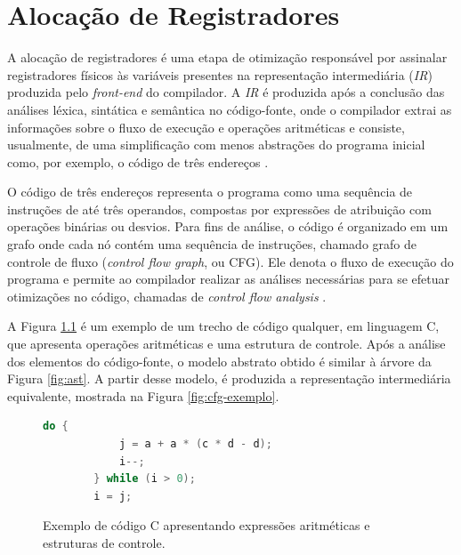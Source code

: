 \documentclass[
	12pt,				%
	openright,			%
	twoside,			%
	a4paper,			%
	tcc,			%
	]{ABNT-DC-UEL}
\begin{document}


% 

\chapter{Alocação de Registradores}

A alocação de registradores é uma etapa de otimização responsável por assinalar registradores físicos às variáveis presentes na representação intermediária (\textit{IR}) produzida pelo \textit{front-end} do compilador. A \textit{IR} é produzida após a conclusão das análises léxica, sintática e semântica no código-fonte, onde o compilador extrai as informações sobre o fluxo de execução e operações aritméticas e consiste, usualmente, de uma simplificação com menos abstrações do programa inicial como, por exemplo, o código de três endereços  \cite{aho:07}.

O código de três endereços representa o programa como uma sequência de instruções de até três operandos, compostas por expressões de atribuição com operações binárias ou desvios. Para fins de análise, o código é organizado em um grafo onde cada nó contém uma sequência de instruções, chamado grafo de controle de fluxo (\textit{control flow graph}, ou CFG). Ele denota o fluxo de execução do programa e permite ao compilador realizar as análises necessárias para se efetuar otimizações no código, chamadas de \textit{control flow analysis} \cite{allen:70}.

A Figura \ref{fig:codigo-exemplo} é um exemplo de um trecho de código qualquer, em linguagem C, que apresenta operações aritméticas e uma estrutura de controle. Após a análise dos elementos do código-fonte, o modelo abstrato obtido é similar à árvore da Figura \ref{fig:ast}. A partir desse modelo, é produzida a representação intermediária equivalente, mostrada na Figura \ref{fig:cfg-exemplo}.

\begin{figure}[ht]
    \centering
    \begin{lstlisting}[language=c, frame=single]
        do {
            j = a + a * (c * d - d);
            i--;
        } while (i > 0);
        i = j;
    \end{lstlisting}
    \caption{Exemplo de código C apresentando expressões aritméticas e estruturas de controle.}
    \label{fig:codigo-exemplo}
\end{figure}
\end{document}
